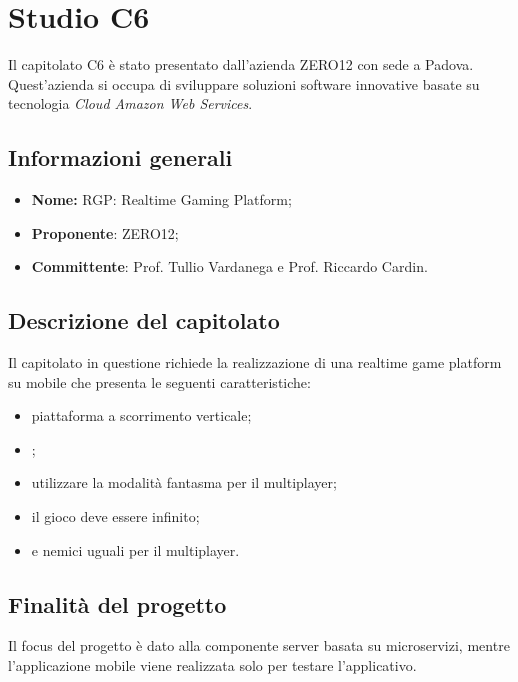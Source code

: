 \section{Studio C6}
Il capitolato C6 è stato presentato dall'azienda ZERO12 con sede a Padova. Quest'azienda si occupa di sviluppare soluzioni software
innovative basate su tecnologia \textit{Cloud Amazon Web Services}.

\subsection{Informazioni generali}
\begin{itemize}
	\item \textbf{Nome:} RGP: Realtime Gaming Platform;
	\item \textbf{Proponente}: ZERO12;
	\item \textbf{Committente}: Prof. Tullio Vardanega e Prof. Riccardo Cardin.
\end{itemize}

\subsection{Descrizione del capitolato}
Il capitolato in questione richiede la realizzazione di una realtime game platform su mobile che presenta le seguenti caratteristiche:
\begin{itemize}
	\item piattaforma a scorrimento verticale;
	\item {};
	\item utilizzare la modalità fantasma per il multiplayer;
	\item il gioco deve essere infinito;
	\item {} e nemici uguali per il multiplayer.
\end{itemize}


\subsection{Finalità del progetto}
Il focus del progetto è dato alla componente server basata su microservizi, mentre l'applicazione mobile viene realizzata solo per testare l'applicativo.

